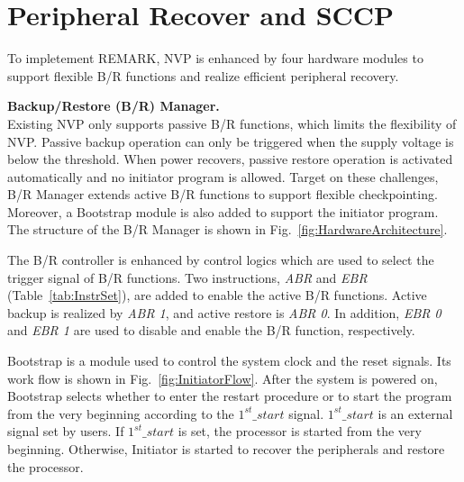 \section{Peripheral Recover and SCCP}	\label{sec:periRec}
%

















To impletement REMARK, NVP is enhanced by four hardware modules to support flexible B/R functions and realize efficient peripheral recovery.

\noindent\textbf{Backup/Restore (B/R) Manager.} \\
Existing NVP only supports passive B/R functions, which limits the flexibility of NVP.
Passive backup operation can only be triggered when the supply voltage is below the threshold.
When power recovers, passive restore operation is activated automatically and no initiator program is allowed. 
Target on these challenges, B/R Manager extends active B/R functions to support flexible checkpointing.
Moreover, a Bootstrap module is also added to support the initiator program.
The structure of the B/R Manager is shown in Fig.~\ref{fig:HardwareArchitecture}.

%
The B/R controller is enhanced by control logics which are used to select the trigger signal of B/R functions.
Two instructions, \emph{ABR} and \emph{EBR} (Table~\ref{tab:InstrSet}), are added to enable the active B/R functions.
Active backup is realized by \emph{ABR 1}, and active restore is \emph{ABR 0}.
In addition, \emph{EBR 0} and \emph{EBR 1} are used to disable and enable the B/R function, respectively.

%
Bootstrap is a module used to control the system clock and the reset signals.
Its work flow is shown in Fig.~\ref{fig:InitiatorFlow}.
After the system is powered on, Bootstrap selects whether to enter the restart procedure or to start the program from the very beginning according to the \emph{$1^{st}\_start$} signal.
\emph{$1^{st}\_start$} is an external signal set by users.
If \emph{$1^{st}\_start$} is set, the processor is started from the very beginning.
Otherwise, Initiator is started to recover the peripherals and restore the processor.

